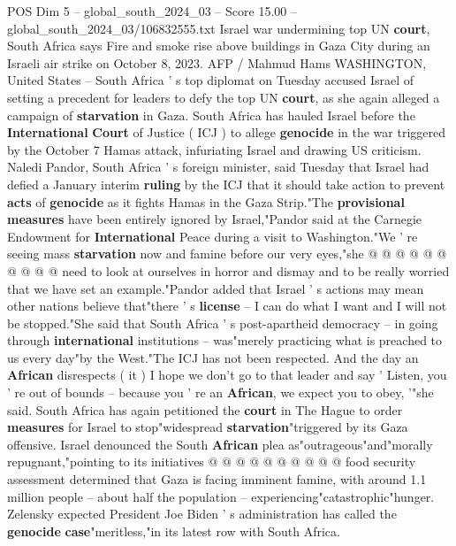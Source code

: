 \begin{textsample}{POS Dim 5 – global\_south\_2024\_03 – Score 15.00 – global\_south\_2024\_03/106832555.txt}  \label{ex:f5_pos_244}
Israel war undermining top UN \textbf{court}, South Africa says Fire and smoke rise above buildings in Gaza City during an Israeli air strike on October 8, 2023.
AFP / Mahmud Hams WASHINGTON, United States -- South Africa ' s top diplomat on Tuesday accused Israel of setting a precedent for leaders to defy the top UN \textbf{court}, as she again alleged a campaign of \textbf{starvation} in Gaza.
South Africa has hauled Israel before the \textbf{International} \textbf{Court} of Justice ( ICJ ) to allege \textbf{genocide} in the war triggered by the October 7 Hamas attack, infuriating Israel and drawing US criticism.
Naledi Pandor, South Africa ' s foreign minister, said Tuesday that Israel had defied a January interim \textbf{ruling} by the ICJ that it should take action to prevent \textbf{acts} of \textbf{genocide} as it fights Hamas in the Gaza Strip."The \textbf{provisional} \textbf{measures} have been entirely ignored by Israel,"Pandor said at the Carnegie Endowment for \textbf{International} Peace during a visit to Washington."We ' re seeing mass \textbf{starvation} now and famine before our very eyes,"she @ @ @ @ @ @ @ @ @ @ need to look at ourselves in horror and dismay and to be really worried that we have set an example."Pandor added that Israel ' s actions may mean other nations believe that"there ' s \textbf{license} -- I can do what I want and I will not be stopped."She said that South Africa ' s post-apartheid democracy -- in going through \textbf{international} institutions -- was"merely practicing what is preached to us every day"by the West."The ICJ has not been respected.
And the day an \textbf{African} disrespects ( it ) I hope we don't go to that leader and say ' Listen, you ' re out of bounds -- because you ' re an \textbf{African}, we expect you to obey, '"she said.
South Africa has again petitioned the \textbf{court} in The Hague to order \textbf{measures} for Israel to stop"widespread \textbf{starvation}"triggered by its Gaza offensive.
Israel denounced the South \textbf{African} plea as"outrageous"and"morally repugnant,"pointing to its initiatives @ @ @ @ @ @ @ @ @ @ food security assessment determined that Gaza is facing imminent famine, with around 1.1 million people -- about half the population -- experiencing"catastrophic"hunger.
Zelensky expected President Joe Biden ' s administration has called the \textbf{genocide} \textbf{case}"meritless,"in its latest row with South Africa.

\end{textsample}
